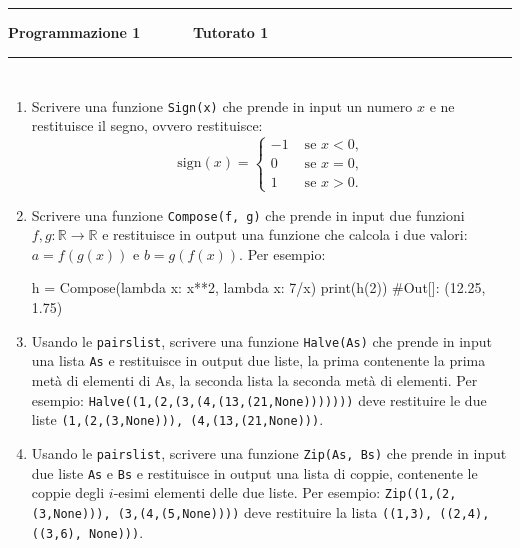 \documentclass[11pt,a4]{article}
\begin{document}
\thispagestyle{empty}
\hrule
\begin{center}
   {\Large {\bf Programmazione 1 \hspace{3cm} $\quad \quad \quad$ Tutorato 1}}
\end{center}

\hrule

\section*{}

\begin{enumerate}

\item Scrivere una funzione {\tt Sign(x)} che prende in input un numero $x$ e ne restituisce il segno, ovvero
restituisce:
\begin{equation*}
\mbox{sign}(x) = \left\{ \begin{array}{ll}
 -1 & \mbox{ se } x<0, \\
 0 &  \mbox{ se } x = 0, \\
 1 & \mbox{ se } x>0.
\end{array} \right.
\end{equation*}

\item Scrivere una funzione {\tt Compose(f, g)} che prende in input due funzioni $f,g : \mathbb{R} \rightarrow \mathbb{R}$
e restituisce in output una funzione che calcola i due valori: $a=f(g(x))$ e $b=g(f(x))$.
Per esempio: 

\begin{python}
h = Compose(lambda x: x**2, lambda x: 7/x)
print(h(2))
#Out[]: (12.25, 1.75)
\end{python}

\item Usando le {\tt pairslist}, scrivere una funzione {\tt Halve(As)} che prende in input una lista
{\tt As} e restituisce in output due liste, la prima contenente la prima metà di elementi di As,
la seconda lista la seconda metà di elementi. 
Per esempio: {\tt Halve((1,(2,(3,(4,(13,(21,None)))))))} deve restituire le due liste
{\tt (1,(2,(3,None))), (4,(13,(21,None)))}.


\item Usando le {\tt pairslist}, scrivere una funzione {\tt Zip(As, Bs)} che prende in input due liste
{\tt As} e {\tt Bs} e restituisce in output una lista di coppie, contenente le coppie degli $i$-esimi 
elementi delle due liste. Per esempio: {\tt Zip((1,(2,(3,None))), (3,(4,(5,None))))} deve restituire la lista
{\tt ((1,3), ((2,4), ((3,6), None)))}.



\end{enumerate}
\end{document}
